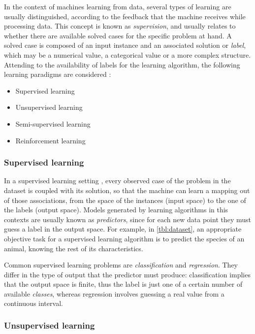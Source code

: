 In the context of machines learning from data, several types of learning are usually distinguished, according to the feedback that the machine receives while processing data. This concept is known as \textit{supervision}, and usually relates to whether there are available solved cases for the specific problem at hand. A solved case is composed of an input instance and an associated solution or \textit{label}, which may be a numerical value, a categorical value or a more complex structure. Attending to the availability of labels for the learning algorithm, the following learning paradigms are considered \cite{bishop2006pattern}:
 
\begin{itemize}
    \item Supervised learning %
    \item Unsupervised learning
    \item Semi-supervised learning
    \item Reinforcement learning
\end{itemize}

\subsubsection{Supervised learning}

In a supervised learning setting , every observed case of the problem in the dataset is coupled with its solution, so that the machine can learn a mapping out of those associations, from the space of the instances (input space) to the one of the labels (output space). Models generated by learning algorithms in this contexts are usually known as \textit{predictors}, since for each new data point they must guess a label in the output space. For example, in \autoref{tbl:dataset}, an appropriate objective task for a supervised learning algorithm is to predict the species of an animal, knowing the rest of its characteristics. 

Common supervised learning problems are \textit{classification} and \textit{regression}. They differ in the type of output that the predictor must produce: classification implies that the output space is finite, thus the label is just one of a certain number of available \textit{classes}, whereas regression involves guessing a real value from a continuous interval. 

\subsubsection{Unsupervised learning}

